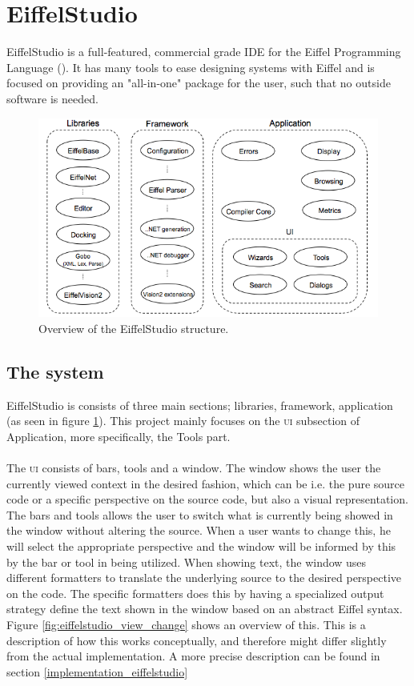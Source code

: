 \section{EiffelStudio}
EiffelStudio is a full-featured, commercial grade IDE for the Eiffel Programming Language (\cite[Quote from Origo website]{eiffel2006}). It has many tools to ease designing systems with Eiffel and is focused on providing an "all-in-one" package for the user, such that no outside software is needed.

\begin{figure}[h]
\centerline{
\includegraphics[scale=0.7]{images/eiffelstudio-structure-full.png}
}
\caption[Overview of the EiffelStudio structure]{Overview of the EiffelStudio structure.}
\label{fig:eiffelstudio_structure}
\end{figure}


\subsection{The system}
EiffelStudio is consists of three main sections; libraries, framework, application (as seen in figure \ref{fig:eiffelstudio_structure}). This project mainly focuses on the \textsc{ui} subsection of Application, more specifically, the Tools part.

\paragraph{}
The \textsc{ui} consists of bars, tools and a window. The window shows the user the currently viewed context in the desired fashion, which can be i.e. the pure source code or a specific perspective on the source code, but also a visual representation. The bars and tools allows the user to switch what is currently being showed in the window without altering the source. When a user wants to change this, he will select the appropriate perspective and the window will be informed by this by the bar or tool in being utilized. When showing text, the window uses different formatters to translate the underlying source to the desired perspective on the code. The specific formatters does this by having a specialized output strategy define the text shown in the window based on an abstract Eiffel syntax. Figure \ref{fig:eiffelstudio_view_change} shows an overview of this. This is a description of how this works conceptually, and therefore might differ slightly from the actual implementation. A more precise description can be found in section \ref{implementation_eiffelstudio}

